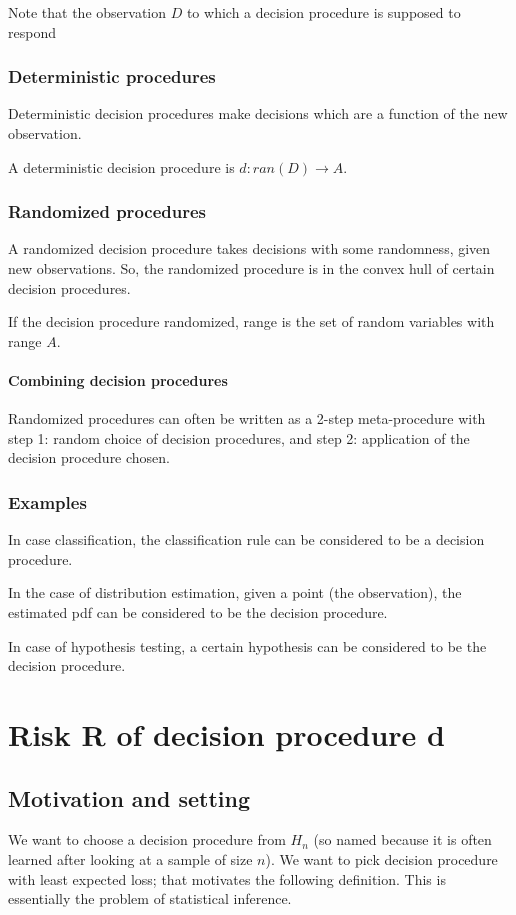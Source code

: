 \documentclass[oneside, article]{memoir}
\begin{document}
Note that the observation $D$ to which a decision procedure is supposed to respond 

\subsubsection{Deterministic procedures}
Deterministic decision procedures make decisions which are a function of the new observation.

A deterministic decision procedure is $d:ran(D) \to A$.

\subsubsection{Randomized procedures}
A randomized decision procedure takes decisions with some randomness, given new observations. So, the randomized procedure is in the convex hull of certain decision procedures.

If the decision procedure randomized, range is the set of random variables with range $A$.

\paragraph{Combining decision procedures}
Randomized procedures can often be written as a 2-step meta-procedure with step 1: random choice of decision procedures, and step 2: application of the decision procedure chosen.

\subsubsection{Examples}
In case classification, the classification rule can be considered to be a decision procedure.

In the case of distribution estimation, given a point (the observation), the estimated pdf can be considered to be the decision procedure.

In case of hypothesis testing, a certain hypothesis can be considered to be the decision procedure.

\section{Risk R of decision procedure d}
\subsection{Motivation and setting}
We want to choose a decision procedure from $H_n$ (so named because it is often learned after looking at a sample of size $n$). We want to pick decision procedure with least expected loss; that motivates the following definition. This is essentially the problem of statistical inference.
\end{document}
